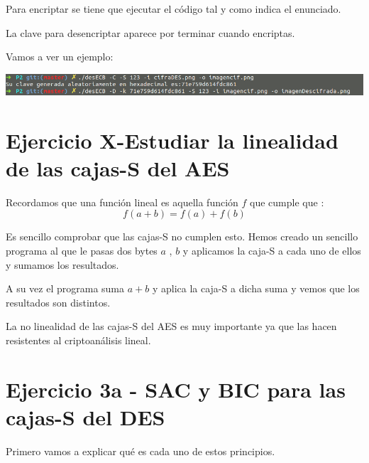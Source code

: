 \documentclass{apuntes}
\begin{document}
Para encriptar se tiene que ejecutar el código tal y como indica el enunciado.

La clave para desencriptar aparece por terminar cuando encriptas.

Vamos a ver un ejemplo:

\begin{center}
		\includegraphics[width=400pt]{EjecutaDES.png}
\end{center}



\section{Ejercicio X-Estudiar la linealidad de las cajas-S del AES}

Recordamos que una función lineal es aquella función $f$ que cumple que :
$$f(a + b) = f(a) + f(b)$$

Es sencillo comprobar que las cajas-S no cumplen esto. Hemos creado un sencillo programa al que le pasas dos bytes $a$ , $b$ y aplicamos la caja-S a cada uno de ellos y sumamos los resultados.

A su vez el programa suma $a + b$ y aplica la caja-S a dicha suma y vemos que los resultados son distintos.

La no linealidad de las cajas-S del AES es muy importante ya que las hacen resistentes al criptoanálisis lineal.

\section{Ejercicio 3a - SAC y BIC para las cajas-S del DES}

Primero vamos a explicar qué es cada uno de estos principios.
\end{document}

